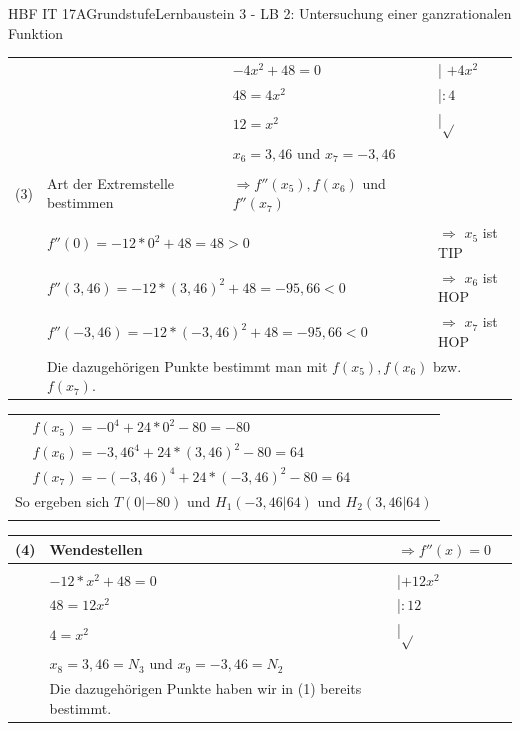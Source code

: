 \documentclass[oneside,openany,headings=optiontotoc,11pt,numbers=noenddot]{scrreprt}
\begin{document}
\begin{worksheet}{HBF IT 17A}{Grundstufe}{Lernbaustein 3 - LB 2: Untersuchung einer ganzrationalen Funktion}
\begin{framed}
\begin{tabularx}{\textwidth}{lXXl}
				& & \(-4x^2+48 = 0\) & | \(+4x^2\)\\
				& & \(48 = 4x^2\) & |\(:4\)\\
				& & \(12 = x^2\) & |\(\sqrt{}\)\\
				& & \colorbox{blue!5}{\(x_6 = 3,46\)} und \colorbox{blue!5}{\(x_7 = -3,46\)}\\
				\\
				(3) & Art der Extremstelle bestimmen & \(\Rightarrow f''(x_5), f(x_6)\) und \(f''(x_7)\)\\
				\hline\\				 
				& \multicolumn{2}{l}{\(f''(0) =  -12*0^2+48 = 48> 0\)} & \(\Rightarrow\) \colorbox{green!10}{\(x_5\) ist TIP}\\
				& \multicolumn{2}{l}{\(f''(3,46) =  -12*(3,46)^2 +48 = -95,66< 0\)} & \(\Rightarrow\) \colorbox{green!10}{\(x_6\) ist HOP}\\
				& \multicolumn{2}{l}{\(f''(-3,46) = -12*(-3,46)^2 +48 = -95,66 < 0\)} & \(\Rightarrow\) \colorbox{green!10}{\(x_7\) ist HOP}\\
				& \multicolumn{3}{l}{Die dazugehörigen Punkte bestimmt man mit \(f(x_5), f(x_6)\) bzw. \(f(x_7)\).}\\
			\end{tabularx}
			\begin{tabularx}{\textwidth}{ll}
				& \(f(x_5) = -0^4 +24*0^2-80 = -80\)\\
				& \(f(x_6) = -3,46^4 +24*(3,46)^2-80 = 64\)\\
				& \(f(x_7) = -(-3,46)^4 +24*(-3,46)^2-80 = 64\)\\
				\multicolumn{2}{l}{So ergeben sich \colorbox{blue!5}{\(T(0|-80)\)} und \colorbox{blue!5}{\(H_1(-3,46|64)\)} und \colorbox{blue!5}{\(H_2(3,46|64)\)}}\\
				\hline\hline\\
			\end{tabularx}
			\begin{tabularx}{\textwidth}{lXXl}
				(4) & Wendestellen & \(\Rightarrow f''(x) = 0\)\\
				\hline\\
				& \(-12*x^2+48 = 0\) & |\(+12x^2\)\\
				& \(48 = 12x^2\) & |\(:12\)\\
				& \(4 = x^2\) & |\(\sqrt{}\)\\
				& \colorbox{green!10}{\(x_8 = 3,46 = N_3\)} und \colorbox{blue!5}{\(x_9 = -3,46 = N_2\)}\\
				& Die dazugehörigen Punkte haben wir in (1) bereits bestimmt.\\

\end{tabularx}
\end{framed}
\end{worksheet}
\end{document}
